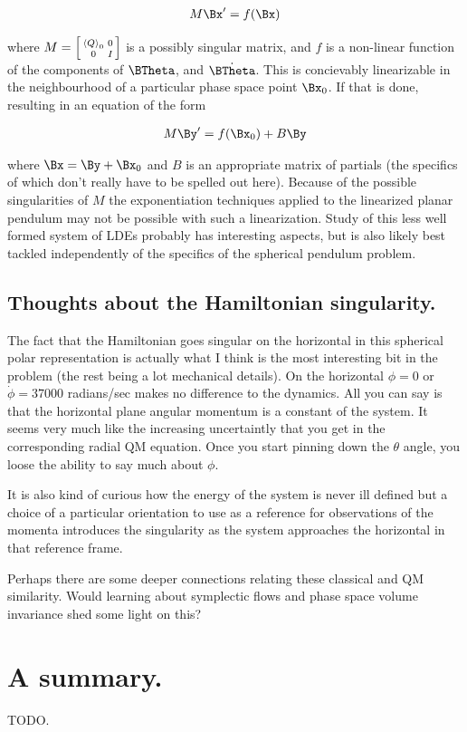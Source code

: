 \begin{align}\label{eqn:multiPendulumSpherical2:boo64}
M \Bx' = f(\Bx)
\end{align}

where $M = \left[\begin{smallmatrix}{\left\langle{{Q}}\right\rangle}_{0} & 0 \\ 0 & I\end{smallmatrix}\right]$ is a possibly singular matrix, and $f$ is a non-linear function of the components of $\BTheta$, and $\dot{\BTheta}$.  This is concievably linearizable in the neighbourhood of a particular phase space point $\Bx_0$.  If that is done, resulting in an equation of the form

\begin{align}\label{eqn:multiPendulumSpherical2:boo65}
M \By' = f(\Bx_0) + B \By 
\end{align}

where $\Bx = \By + \Bx_0$ and $B$ is an appropriate matrix of partials (the specifics of which don't really have to be spelled out here).  Because of the possible singularities of $M$ the exponentiation techniques applied to the linearized planar pendulum may not be possible with such a linearization.  Study of this less well formed system of LDEs probably has interesting aspects, but is also likely best tackled independently of the specifics of the spherical pendulum problem.

\subsection{Thoughts about the Hamiltonian singularity.}

The fact that the Hamiltonian goes singular on the horizontal in this spherical polar representation is actually what I think is the most interesting bit in the problem (the rest being a lot mechanical details).  On the horizontal $\phi=0$ or $\dot{\phi} = 37000$ radians/sec makes no difference to the dynamics.  All you can say is that the horizontal plane angular momentum is a constant of the system.  It seems very much like the increasing uncertaintly that you get in the corresponding radial QM equation.  Once you start pinning down the $\theta$ angle, you loose the ability to say much about $\phi$.

It is also kind of curious how the energy of the system is never ill defined but a choice of a particular orientation to use as a reference for observations of the momenta introduces the singularity as the system approaches the horizontal in that reference frame.

Perhaps there are some deeper connections relating these classical and QM similarity.  Would learning about symplectic flows and phase space volume invariance shed some light on this? 

\section{A summary.}

TODO.

\EndArticle
